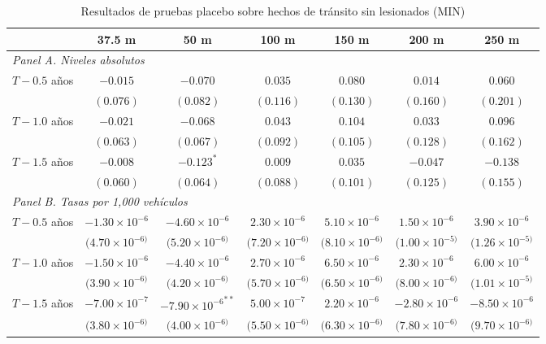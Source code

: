 \begin{table}[htbp]
    \centering
    \caption{Resultados de pruebas placebo sobre hechos de tránsito sin lesionados (MIN)}
    \label{tab:placebo-min}
    \footnotesize
    \begin{adjustbox}{max width=\textwidth}
    \begin{tabular}{lcccccc}
        \toprule
        & 37.5 m & 50 m & 100 m & 150 m & 200 m & 250 m \\
        \midrule
        \multicolumn{7}{l}{\textit{Panel A. Niveles absolutos}} \\
        $T - 0.5$ años & $-0.015$ & $-0.070$ & $0.035$ & $0.080$ & $0.014$ & $0.060$ \\
         & $(0.076)$ & $(0.082)$ & $(0.116)$ & $(0.130)$ & $(0.160)$ & $(0.201)$ \\
        $T - 1.0$ años & $-0.021$ & $-0.068$ & $0.043$ & $0.104$ & $0.033$ & $0.096$ \\
         & $(0.063)$ & $(0.067)$ & $(0.092)$ & $(0.105)$ & $(0.128)$ & $(0.162)$ \\
        $T - 1.5$ años & $-0.008$ & $-0.123^{*}$ & $0.009$ & $0.035$ & $-0.047$ & $-0.138$ \\
         & $(0.060)$ & $(0.064)$ & $(0.088)$ & $(0.101)$ & $(0.125)$ & $(0.155)$ \\
        \midrule
        \multicolumn{7}{l}{\textit{Panel B. Tasas por 1,000 vehículos}} \\
        $T - 0.5$ años & $-1.30\times 10^{-6}$ & $-4.60\times 10^{-6}$ & $2.30\times 10^{-6}$ & $5.10\times 10^{-6}$ & $1.50\times 10^{-6}$ & $3.90\times 10^{-6}$ \\
         & $(4.70\times 10^{-6)}$ & $(5.20\times 10^{-6)}$ & $(7.20\times 10^{-6)}$ & $(8.10\times 10^{-6)}$ & $(1.00\times 10^{-5)}$ & $(1.26\times 10^{-5)}$ \\
        $T - 1.0$ años & $-1.50\times 10^{-6}$ & $-4.40\times 10^{-6}$ & $2.70\times 10^{-6}$ & $6.50\times 10^{-6}$ & $2.30\times 10^{-6}$ & $6.00\times 10^{-6}$ \\
         & $(3.90\times 10^{-6)}$ & $(4.20\times 10^{-6)}$ & $(5.70\times 10^{-6)}$ & $(6.50\times 10^{-6)}$ & $(8.00\times 10^{-6)}$ & $(1.01\times 10^{-5)}$ \\
        $T - 1.5$ años & $-7.00\times 10^{-7}$ & $-7.90\times {10^{-6}}^{**}$ & $5.00\times 10^{-7}$ & $2.20\times 10^{-6}$ & $-2.80\times 10^{-6}$ & $-8.50\times 10^{-6}$ \\
         & $(3.80\times 10^{-6)}$ & $(4.00\times 10^{-6)}$ & $(5.50\times 10^{-6)}$ & $(6.30\times 10^{-6)}$ & $(7.80\times 10^{-6)}$ & $(9.70\times 10^{-6)}$ \\
        \bottomrule
    \end{tabular}
    \end{adjustbox}


\end{table}
